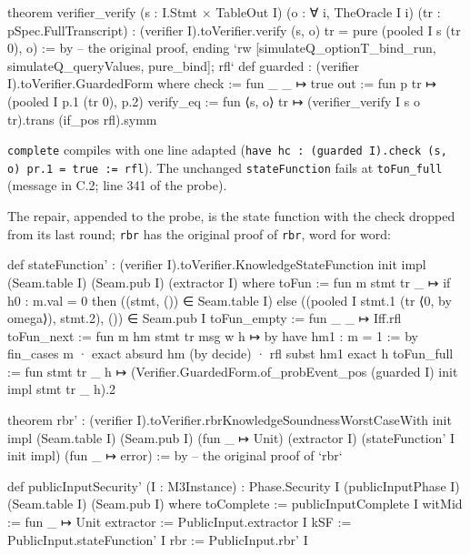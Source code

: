 \begin{leancode}
theorem verifier_verify (s : I.Stmt × TableOut I) (o : ∀ i, TheOracle I i)
    (tr : pSpec.FullTranscript) :
    (verifier I).toVerifier.verify (s, o) tr = pure (pooled I s (tr 0), o) := by
  -- the original proof, ending `rw [simulateQ_optionT_bind_run, simulateQ_queryValues, pure_bind]; rfl`
def guarded : (verifier I).toVerifier.GuardedForm where
  check := fun _ _ ↦ true
  out := fun p tr ↦ (pooled I p.1 (tr 0), p.2)
  verify_eq := fun ⟨s, o⟩ tr ↦ (verifier_verify I s o tr).trans (if_pos rfl).symm
\end{leancode}

\texttt{complete} compiles with one line adapted (\texttt{h\allowbreak{}a\allowbreak{}v\allowbreak{}e\allowbreak{} h\allowbreak{}c\allowbreak{} :\allowbreak{} (\allowbreak{}g\allowbreak{}u\allowbreak{}a\allowbreak{}r\allowbreak{}d\allowbreak{}e\allowbreak{}d\allowbreak{} I\allowbreak{})\allowbreak{}.\allowbreak{}c\allowbreak{}h\allowbreak{}e\allowbreak{}c\allowbreak{}k\allowbreak{} (\allowbreak{}s\allowbreak{},\allowbreak{} o\allowbreak{})\allowbreak{} p\allowbreak{}r\allowbreak{}.\allowbreak{}1\allowbreak{} =\allowbreak{} t\allowbreak{}r\allowbreak{}u\allowbreak{}e\allowbreak{} :\allowbreak{}=\allowbreak{} r\allowbreak{}f\allowbreak{}l}). The unchanged \texttt{stateFunction} fails at \texttt{toFun\_\allowbreak{}full} (message in C.2; line 341 of the probe).

The repair, appended to the probe, is the state function with the check dropped from its last round; \texttt{rbr\textquotesingle{}} has the original proof of \texttt{rbr}, word for word:

\begin{leancode}
def stateFunction' :
    (verifier I).toVerifier.KnowledgeStateFunction init impl (Seam.table I) (Seam.pub I)
      (extractor I) where
  toFun := fun m stmt tr _ ↦
    if h0 : m.val = 0 then ((stmt, ()) ∈ Seam.table I)
    else ((pooled I stmt.1 (tr ⟨0, by omega⟩), stmt.2), ()) ∈ Seam.pub I
  toFun_empty := fun _ _ ↦ Iff.rfl
  toFun_next := fun m hm stmt tr msg w h ↦ by
    have hm1 : m = 1 := by
      fin_cases m
      · exact absurd hm (by decide)
      · rfl
    subst hm1
    exact h
  toFun_full := fun stmt tr _ h ↦
    (Verifier.GuardedForm.of_probEvent_pos (guarded I) init impl stmt tr _ h).2

theorem rbr' :
    (verifier I).toVerifier.rbrKnowledgeSoundnessWorstCaseWith init impl (Seam.table I)
      (Seam.pub I) (fun _ ↦ Unit) (extractor I) (stateFunction' I init impl)
      (fun _ ↦ error) := by
  -- the original proof of `rbr`

def publicInputSecurity' (I : M3Instance) :
    Phase.Security I (publicInputPhase I) (Seam.table I) (Seam.pub I) where
  toComplete := publicInputComplete I
  witMid := fun _ ↦ Unit
  extractor := PublicInput.extractor I
  kSF := PublicInput.stateFunction' I
  rbr := PublicInput.rbr' I
\end{leancode}

